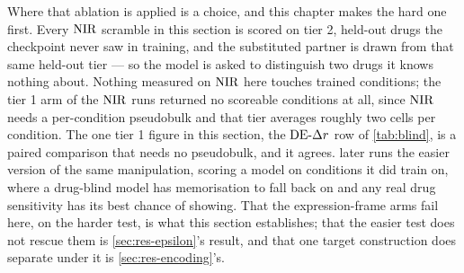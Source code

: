 Where that ablation is applied is a choice, and this chapter makes the hard one
first. Every $\textrm{NIR}$ scramble in this section is scored on tier 2, held-out drugs the checkpoint never saw in training, and the substituted partner is drawn from that same held-out tier --- so the model is asked to distinguish two drugs it knows nothing about. Nothing measured on $\textrm{NIR}$ here touches trained conditions; the tier 1 arm of the $\textrm{NIR}$ runs returned no scoreable conditions at all, since $\textrm{NIR}$ needs a per-condition pseudobulk and that tier averages roughly two cells per condition. The one tier 1 figure in this section, the $\textrm{DE-}\Delta r$ row of \cref{tab:blind}, is a paired comparison that needs no pseudobulk, and it agrees.  later runs the easier version of the same
manipulation, scoring a model on conditions it did train on, where a drug-blind
model has memorisation to fall back on and any real drug sensitivity has its
best chance of showing. That the expression-frame arms fail here, on the harder
test, is what this section establishes; that the easier test does not rescue
them is \cref{sec:res-epsilon}'s result, and that one target construction does
separate under it is \cref{sec:res-encoding}'s.

